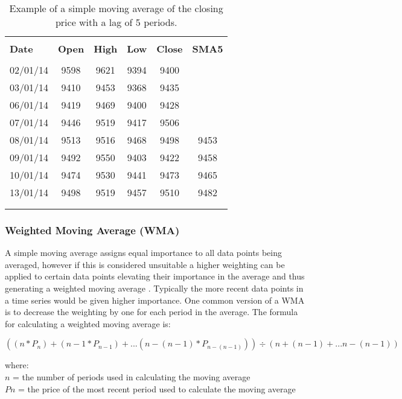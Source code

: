 \begin{table}[htbp]
  \centering
  \caption[Example of a Simple Moving Average]{Example of a simple moving average of the closing price with a lag of 5 periods.}
    \begin{tabular}{@{\extracolsep{5pt}}lccccc}
    \\[-1.8ex]\hline 
    \hline \\[-1.8ex] 
    \textbf{Date} & \textbf{Open} & \textbf{High} & \textbf{Low} & \textbf{Close} & \textbf{SMA5} \\
    \hline \\[-1.8ex] 
    02/01/14 & 9598  & 9621  & 9394  & 9400  &  \\
    03/01/14 & 9410  & 9453  & 9368  & 9435  &  \\
    06/01/14 & 9419  & 9469  & 9400  & 9428  &  \\
    07/01/14 & 9446  & 9519  & 9417  & 9506  &  \\
    08/01/14 & 9513  & 9516  & 9468  & 9498  & 9453 \\
    09/01/14 & 9492  & 9550  & 9403  & 9422  & 9458 \\
    10/01/14 & 9474  & 9530  & 9441  & 9473  & 9465 \\
    13/01/14 & 9498  & 9519  & 9457  & 9510  & 9482 \\
    \hline \\[-1.8ex] 
    \normalsize 
    \end{tabular}%
  \label{tab:SMA}%
\end{table}%

\subsubsection{Weighted Moving Average (WMA)}
A simple moving average assigns equal importance to all data points being averaged, however if this is considered unsuitable a higher weighting can be applied to certain data points elevating their importance in the average and thus generating a weighted moving average \citep{WMA2}. Typically the more recent data points in a time series would be given higher importance. One common version of a WMA is to decrease the weighting by one for each period in the average. The formula for calculating a weighted moving average is:

\[ ((n*P_{n}) + (n-1*P_{n-1})+ ... (n-(n-1)*P_{n-(n-1)})) \div (n + (n-1) + ... n-(n-1))\]

where: \\
$ n $ = the number of periods used in calculating the moving average \\
$ Pn $ = the price of the most recent period used to calculate the moving average 

